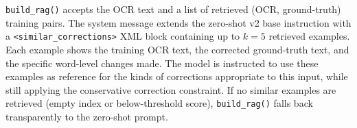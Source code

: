 \texttt{build\_rag()} accepts the OCR text and a list of retrieved
(OCR, ground-truth) training pairs. The system message extends the zero-shot
v2 base instruction with a \texttt{<similar\_corrections>} XML block
containing up to $k=5$ retrieved examples. Each example shows the training
OCR text, the corrected ground-truth text, and the specific word-level
changes made. The model is instructed to use these examples as reference for
the kinds of corrections appropriate to this input, while still applying the
conservative correction constraint. If no similar examples are retrieved
(empty index or below-threshold score), \texttt{build\_rag()} falls back
transparently to the zero-shot prompt.
